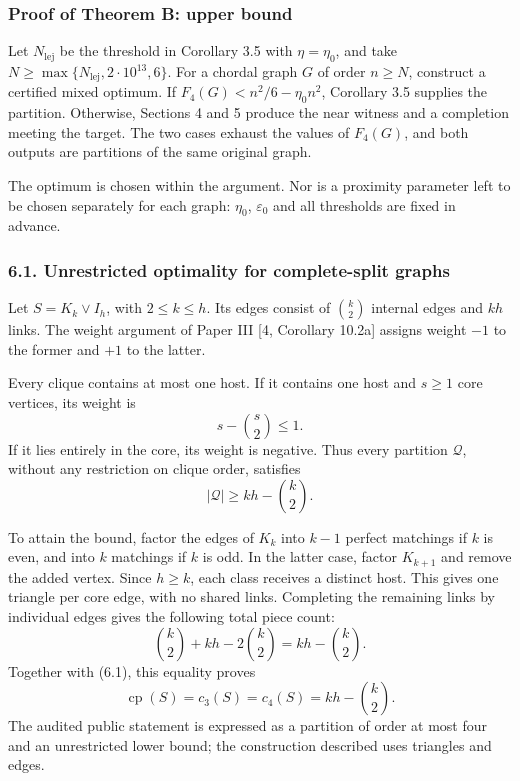 \documentclass[english,11pt,a4paper]{article}
\begin{document}
\subsubsection{Proof of Theorem B: upper bound}\label{proof-of-theorem-b-upper-bound}

Let \(N_{\mathrm{lej}}\) be the threshold in Corollary 3.5 with \(\eta=\eta_0\), and take \(N\ge\max\{N_{\mathrm{lej}},2\cdot10^{13},6\}\). For a chordal graph \(G\) of order \(n\ge N\), construct a certified mixed optimum. If \(F_4(G)<n^2/6-\eta_0n^2\), Corollary 3.5 supplies the partition. Otherwise, Sections 4 and 5 produce the near witness and a completion meeting the target. The two cases exhaust the values of \(F_4(G)\), and both outputs are partitions of the same original graph.

The optimum is chosen within the argument. Nor is a proximity parameter left to be chosen separately for each graph: \(\eta_0\), \(\varepsilon_0\) and all thresholds are fixed in advance.

\subsubsection{6.1. Unrestricted optimality for complete-split graphs}\label{unrestricted-optimality-for-complete-split-graphs}

Let \(S=K_k\vee I_h\), with \(2\le k\le h\). Its edges consist of \(\binom k2\) internal edges and \(kh\) links. The weight argument of Paper III {[}4, Corollary 10.2a{]} assigns weight \(-1\) to the former and \(+1\) to the latter.

Every clique contains at most one host. If it contains one host and \(s\ge1\) core vertices, its weight is \[
s-\binom s2\le1.
\] If it lies entirely in the core, its weight is negative. Thus every partition \(\mathcal Q\), without any restriction on clique order, satisfies \[
|\mathcal Q|\ge kh-\binom k2.
\tag{6.1}
\]

To attain the bound, factor the edges of \(K_k\) into \(k-1\) perfect matchings if \(k\) is even, and into \(k\) matchings if \(k\) is odd. In the latter case, factor \(K_{k+1}\) and remove the added vertex. Since \(h\ge k\), each class receives a distinct host. This gives one triangle per core edge, with no shared links. Completing the remaining links by individual edges gives the following total piece count: \[
\binom k2+kh-2\binom k2=kh-\binom k2.
\] Together with (6.1), this equality proves \[
\operatorname{cp}(S)=c_3(S)=c_4(S)=kh-\binom k2.
\tag{6.2}
\] The audited public statement is expressed as a partition of order at most four and an unrestricted lower bound; the construction described uses triangles and edges.
\end{document}

